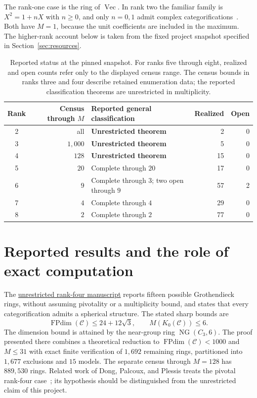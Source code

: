 \documentclass[11pt,a4paper]{article}
\newcommand{\FPdim}{\operatorname{FPdim}}
\newcommand{\Vect}{\operatorname{Vec}}
\newcommand{\NearGroup}{\operatorname{NG}}
\newcommand{\snap}{https://github.com/sebastienpalcoux/grothendieck-ring-classification/blob/e34396cd95aff1090c10974dd934fe6054ca45eb}
\newcommand{\prooflink}[2]{\href{\snap/#1}{#2}}
\begin{document}
The rank-one case is the ring of $\Vect$. In rank two the familiar family is
$X^2=1+nX$ with $n\geq0$, and only $n=0,1$ admit complex
categorifications~\cite{Ostrik2}. Both have $M=1$, because the unit
coefficients are included in the maximum. The higher-rank account below is
taken from the fixed project snapshot specified in Section~\ref{sec:resources}.

\begin{table}[ht]
\centering\small
\setlength{\tabcolsep}{5pt}
\begin{tabularx}{\textwidth}{c r X r r}
\toprule
Rank & Census through $M$ & Reported general classification & Realized & Open\\
\midrule
2 & all & \textbf{Unrestricted theorem} & 2 & 0\\
3 & $1{,}000$ & \textbf{Unrestricted theorem} & 5 & 0\\
4 & $128$ & \textbf{Unrestricted theorem} & 15 & 0\\
5 & $20$ & Complete through $20$ & 17 & 0\\
6 & $9$ & Complete through $3$; two open through $9$ & 57 & 2\\
7 & $4$ & Complete through $4$ & 29 & 0\\
8 & $2$ & Complete through $2$ & 77 & 0\\
\bottomrule
\end{tabularx}
\caption{Reported status at the pinned snapshot. For ranks five through
eight, realized and open counts refer only to the displayed census range.
The census bounds in ranks three and four describe retained enumeration
data; the reported classification theorems are unrestricted in multiplicity.}
\label{tab:scope}
\end{table}

\section{Reported results and the role of exact computation}
The \prooflink{manuscripts/rank4/papers/companion.pdf}{unrestricted rank-four manuscript}
reports fifteen possible Grothendieck rings, without assuming pivotality or
a multiplicity bound, and states that every categorification admits a
spherical structure. The stated sharp bounds are
\[
 \FPdim(\mathcal C)\leq24+12\sqrt3,\qquad M(K_0(\mathcal C))\leq6.
\]
The dimension bound is attained by the near-group ring $\NearGroup(C_3,6)$.
The proof presented there combines a theoretical reduction to
$\FPdim(\mathcal C)<1000$ and $M\leq31$ with exact finite verification of
$1{,}692$ remaining rings, partitioned into $1{,}677$ exclusions and
$15$ models. The separate census through $M=128$ has $889{,}530$
rings. Related work of Dong, Palcoux, and Plessis treats the pivotal
rank-four case~\cite{DPP}; its hypothesis should be distinguished from
the unrestricted claim of this project.
\end{document}
